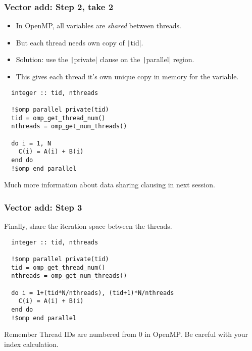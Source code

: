 \documentclass{beamer}
\begin{document}
\begin{frame}[fragile]
\frametitle{Vector add: Step 2, take 2}

\begin{itemize}
  \item In OpenMP, all variables are \emph{shared} between threads.
  \item But each thread needs own copy of \texttt|tid|.
  \item Solution: use the \texttt|private| clause on the \texttt|parallel| region.
  \item This gives each thread it's own unique copy in memory for the variable.
\end{itemize}

\begin{verbatim}
  integer :: tid, nthreads

  !$omp parallel private(tid)
  tid = omp_get_thread_num()
  nthreads = omp_get_num_threads()

  do i = 1, N
    C(i) = A(i) + B(i)
  end do
  !$omp end parallel
\end{verbatim}
Much more information about data sharing clausing in next session.
\end{frame}

\begin{frame}[fragile]
\frametitle{Vector add: Step 3}
Finally, share the iteration space between the threads.
\begin{verbatim}
  integer :: tid, nthreads

  !$omp parallel private(tid)
  tid = omp_get_thread_num()
  nthreads = omp_get_num_threads()

  do i = 1+(tid*N/nthreads), (tid+1)*N/nthreads
    C(i) = A(i) + B(i)
  end do
  !$omp end parallel
\end{verbatim}
\begin{block}{Remember}
Thread IDs are numbered from 0 in OpenMP.
Be careful with your index calculation.
\end{block}
\end{frame}
\end{document}

